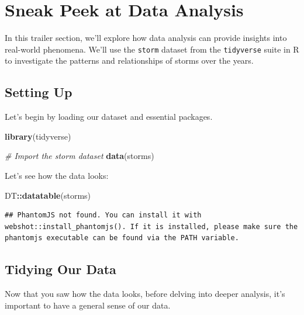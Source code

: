 \documentclass[
]{book}
\newenvironment{Shaded}{\begin{snugshade}}{\end{snugshade}}
\newcommand{\CommentTok}[1]{\textcolor[rgb]{0.56,0.35,0.01}{\textit{#1}}}
\newcommand{\FunctionTok}[1]{\textcolor[rgb]{0.13,0.29,0.53}{\textbf{#1}}}
\newcommand{\NormalTok}[1]{#1}
\newcommand{\SpecialCharTok}[1]{\textcolor[rgb]{0.81,0.36,0.00}{\textbf{#1}}}
\begin{document}
\hypertarget{sneak-peek-at-data-analysis}{%
\section{Sneak Peek at Data Analysis}\label{sneak-peek-at-data-analysis}}

In this trailer section, we'll explore how data analysis can provide insights into real-world phenomena. We'll use the \texttt{storm} dataset from the \texttt{tidyverse} suite in R to investigate the patterns and relationships of storms over the years.

\hypertarget{setting-up}{%
\subsection{Setting Up}\label{setting-up}}

Let's begin by loading our dataset and essential packages.

\begin{Shaded}
\begin{Highlighting}[]
\FunctionTok{library}\NormalTok{(tidyverse)}

\CommentTok{\# Import the storm dataset}
\FunctionTok{data}\NormalTok{(storms)}
\end{Highlighting}
\end{Shaded}

Let's see how the data looks:

\begin{Shaded}
\begin{Highlighting}[]
\NormalTok{DT}\SpecialCharTok{::}\FunctionTok{datatable}\NormalTok{(storms)}
\end{Highlighting}
\end{Shaded}

\begin{verbatim}
## PhantomJS not found. You can install it with webshot::install_phantomjs(). If it is installed, please make sure the phantomjs executable can be found via the PATH variable.
\end{verbatim}

\hypertarget{tidying-our-data}{%
\subsection{Tidying Our Data}\label{tidying-our-data}}

Now that you saw how the data looks, before delving into deeper analysis, it's important to have a general sense of our data.
\end{document}
